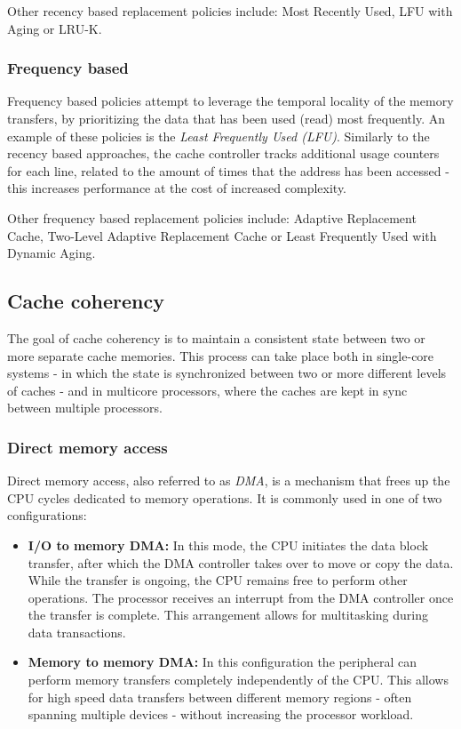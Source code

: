 \vspace{10px}\noindent Other recency based replacement policies include: Most Recently Used, LFU with Aging or LRU-K. %

\subsubsection{Frequency based}
Frequency based policies attempt to leverage the temporal locality of the memory transfers, by prioritizing the data that has been used (read) most frequently.
An example of these policies is the \textit{Least Frequently Used (LFU)}. Similarly to the recency based approaches, the cache controller tracks additional usage counters
for each line, related to the amount of times that the address has been accessed - this increases performance at the cost of increased complexity.

\vspace{10px}\noindent Other frequency based replacement policies include: Adaptive Replacement Cache, Two-Level Adaptive Replacement Cache or Least Frequently Used with Dynamic Aging. %
%
\subsection{Cache coherency}

The goal of cache coherency is to maintain a consistent state between two or
more separate cache memories. This process can take place both in single-core
systems - in which the state is synchronized between two or more different levels of caches
- and in multicore processors, where the caches are kept in sync between multiple
processors.

\subsubsection{Direct memory access} \label{sec:dma}
Direct memory access, also referred to as \textit{DMA}, is a mechanism that
frees up the CPU cycles dedicated to memory operations. It is commonly used 
in one of two configurations:

\begin{itemize}
	\item \textbf{I/O to memory DMA:} In this mode, the CPU initiates the data block %
		transfer, after which the DMA controller takes over to move or copy the data.
		While the transfer is ongoing, the CPU remains free to perform other operations.
		The processor receives an interrupt from the DMA controller once the transfer is complete.
		This arrangement allows for multitasking during data transactions.
	\item \textbf{Memory to memory DMA:} In this configuration the peripheral can perform memory %
		transfers completely independently of the CPU. This allows for high speed data transfers
		between different memory regions - often spanning multiple devices - without increasing
		the processor workload.
\end{itemize}

